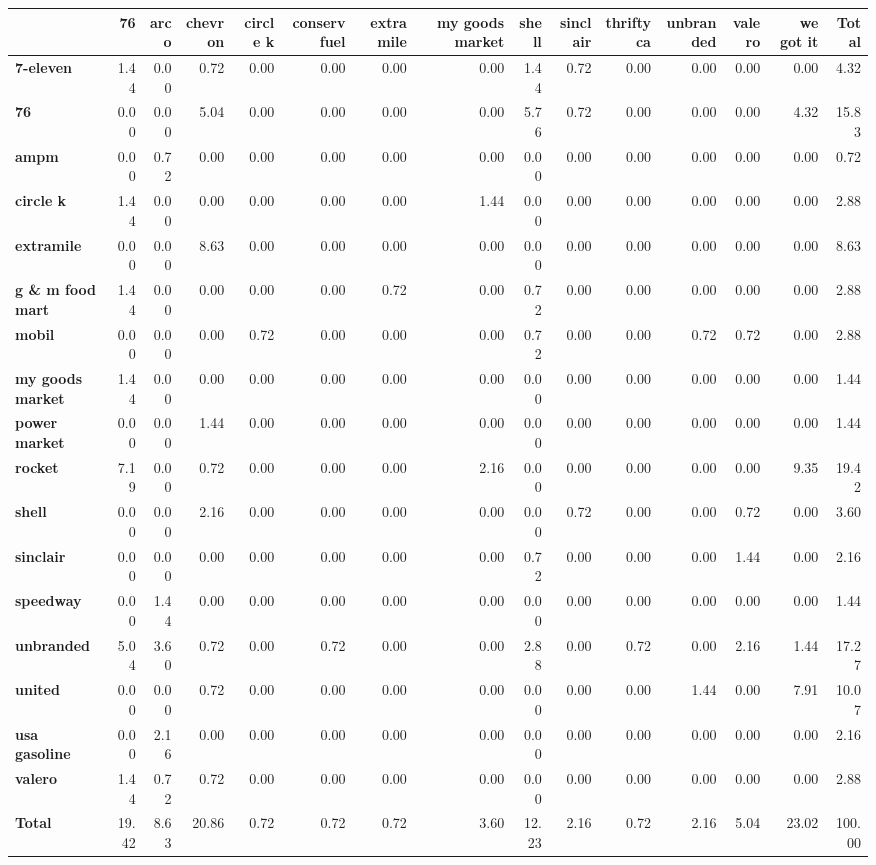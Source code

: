 \begin{tabular}{lrrrrrrrrrrrrrr}
\toprule
 & \textbf{76} & \textbf{arco} & \textbf{chevron} & \textbf{circle k} & \textbf{conserv fuel} & \textbf{extramile} & \textbf{my goods market} & \textbf{shell} & \textbf{sinclair} & \textbf{thrifty ca} & \textbf{unbranded} & \textbf{valero} & \textbf{we got it} & \textbf{Total} \\
\midrule
\textbf{7-eleven} & 1.44 & 0.00 & 0.72 & 0.00 & 0.00 & 0.00 & 0.00 & 1.44 & 0.72 & 0.00 & 0.00 & 0.00 & 0.00 & 4.32 \\
\textbf{76} & 0.00 & 0.00 & 5.04 & 0.00 & 0.00 & 0.00 & 0.00 & 5.76 & 0.72 & 0.00 & 0.00 & 0.00 & 4.32 & 15.83 \\
\textbf{ampm} & 0.00 & 0.72 & 0.00 & 0.00 & 0.00 & 0.00 & 0.00 & 0.00 & 0.00 & 0.00 & 0.00 & 0.00 & 0.00 & 0.72 \\
\textbf{circle k} & 1.44 & 0.00 & 0.00 & 0.00 & 0.00 & 0.00 & 1.44 & 0.00 & 0.00 & 0.00 & 0.00 & 0.00 & 0.00 & 2.88 \\
\textbf{extramile} & 0.00 & 0.00 & 8.63 & 0.00 & 0.00 & 0.00 & 0.00 & 0.00 & 0.00 & 0.00 & 0.00 & 0.00 & 0.00 & 8.63 \\
\textbf{g \& m food mart} & 1.44 & 0.00 & 0.00 & 0.00 & 0.00 & 0.72 & 0.00 & 0.72 & 0.00 & 0.00 & 0.00 & 0.00 & 0.00 & 2.88 \\
\textbf{mobil} & 0.00 & 0.00 & 0.00 & 0.72 & 0.00 & 0.00 & 0.00 & 0.72 & 0.00 & 0.00 & 0.72 & 0.72 & 0.00 & 2.88 \\
\textbf{my goods market} & 1.44 & 0.00 & 0.00 & 0.00 & 0.00 & 0.00 & 0.00 & 0.00 & 0.00 & 0.00 & 0.00 & 0.00 & 0.00 & 1.44 \\
\textbf{power market} & 0.00 & 0.00 & 1.44 & 0.00 & 0.00 & 0.00 & 0.00 & 0.00 & 0.00 & 0.00 & 0.00 & 0.00 & 0.00 & 1.44 \\
\textbf{rocket} & 7.19 & 0.00 & 0.72 & 0.00 & 0.00 & 0.00 & 2.16 & 0.00 & 0.00 & 0.00 & 0.00 & 0.00 & 9.35 & 19.42 \\
\textbf{shell} & 0.00 & 0.00 & 2.16 & 0.00 & 0.00 & 0.00 & 0.00 & 0.00 & 0.72 & 0.00 & 0.00 & 0.72 & 0.00 & 3.60 \\
\textbf{sinclair} & 0.00 & 0.00 & 0.00 & 0.00 & 0.00 & 0.00 & 0.00 & 0.72 & 0.00 & 0.00 & 0.00 & 1.44 & 0.00 & 2.16 \\
\textbf{speedway} & 0.00 & 1.44 & 0.00 & 0.00 & 0.00 & 0.00 & 0.00 & 0.00 & 0.00 & 0.00 & 0.00 & 0.00 & 0.00 & 1.44 \\
\textbf{unbranded} & 5.04 & 3.60 & 0.72 & 0.00 & 0.72 & 0.00 & 0.00 & 2.88 & 0.00 & 0.72 & 0.00 & 2.16 & 1.44 & 17.27 \\
\textbf{united} & 0.00 & 0.00 & 0.72 & 0.00 & 0.00 & 0.00 & 0.00 & 0.00 & 0.00 & 0.00 & 1.44 & 0.00 & 7.91 & 10.07 \\
\textbf{usa gasoline} & 0.00 & 2.16 & 0.00 & 0.00 & 0.00 & 0.00 & 0.00 & 0.00 & 0.00 & 0.00 & 0.00 & 0.00 & 0.00 & 2.16 \\
\textbf{valero} & 1.44 & 0.72 & 0.72 & 0.00 & 0.00 & 0.00 & 0.00 & 0.00 & 0.00 & 0.00 & 0.00 & 0.00 & 0.00 & 2.88 \\
\textbf{Total} & 19.42 & 8.63 & 20.86 & 0.72 & 0.72 & 0.72 & 3.60 & 12.23 & 2.16 & 0.72 & 2.16 & 5.04 & 23.02 & 100.00 \\
\bottomrule
\end{tabular}
